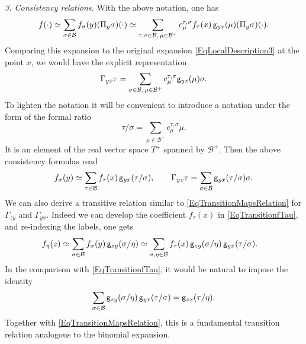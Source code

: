 \documentclass[10pt, reqno]{amsart}
\numberwithin{subsection}{section}
\numberwithin{subsubsection}{subsection}
\numberwithin{equation}{section} %
\theoremstyle{mystyle}
\theoremstyle{mystyle2}
\theoremstyle{mystyle3}
\newcommand{\ssk}{\smallskip}
\newcommand{\mcB}{\mathcal{B}}
\begin{document}
{\it 3. Consistency relations.} With the above notation, one has
$$
f(\cdot) \simeq \sum_{\sigma\in\mcB} f_\sigma(y)(\Pi_y\sigma)(\cdot) \simeq \sum_{\tau,\sigma\in\mcB,\,\mu\in\mcB^+} c_\mu^{\tau,\sigma}f_\tau(x) \, {\sf g}_{yx}(\mu)(\Pi_y\sigma)(\cdot).
$$
Comparing this expansion to the original expansion \eqref{EqLocalDescription3} at the point $x$, we would have the explicit representation
$$
\Gamma_{yx}\tau = \sum_{\sigma\in\mcB,\,\mu\in\mcB^+}c_\mu^{\tau,\sigma}{\sf g}_{yx}(\mu) \sigma.
$$
To lighten the notation it will be convenient to introduce a notation under the form of the formal ratio 
$$
\tau/\sigma=\sum_{\mu\in\mcB^+}c_\mu^{\tau,\sigma}\mu.
$$
It is an element of the real vector space $T^+$ spanned by $\mcB^+$. Then the above consistency formulas read
$$
f_\sigma(y) \simeq \sum_{\tau\in\mcB}f_\tau(x) \, {\sf g}_{yx}(\tau/\sigma),\qquad
\Gamma_{yx}\tau = \sum_{\sigma\in\mcB}{\sf g}_{yx}(\tau/\sigma)\sigma.
$$
We can also derive a transitive relation similar to \eqref{EqTransitionMapsRelation} for $\Gamma_{zy}$ and $\Gamma_{yx}$. Indeed we can develop the coefficient $f_\tau(x)$ in \eqref{EqTransitionfTau}, and re-indexing the labels, one gets
\begin{equation} \label{EqDeltaDeltaPlus} \begin{split}
f_\eta(z) &\simeq \sum_{\sigma\in\mcB} f_\sigma(y)\,{\sf g}_{zy}(\sigma/\eta)
\simeq \sum_{\sigma,\eta\in\mcB} f_\tau(x)\,{\sf g}_{zy}(\sigma/\eta) \, {\sf g}_{yx}(\tau/\sigma).
\end{split} \end{equation}
In the comparison with \eqref{EqTransitionfTau}, it would be natural to impose the identity
\begin{equation}  \label{EqTransitionMapsRelation2}
\sum_{\sigma\in\mcB} {\sf g}_{zy}(\sigma/\eta) \, {\sf g}_{yx}(\tau/\sigma) 
= 
{\sf g}_{zx}(\tau/\eta).
\end{equation}
Together with \eqref{EqTransitionMapsRelation}, this is a fundamental transition relation analogous to the binomial expansion.

\ssk
\end{document}
